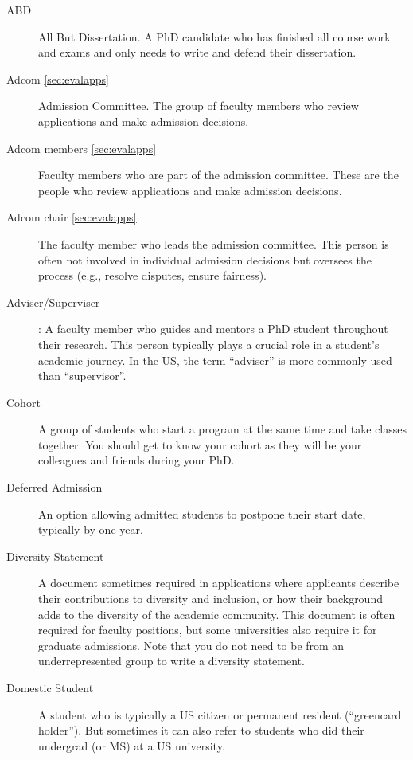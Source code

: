 \documentclass[oneside,11pt,dvipsnames]{book}
\begin{document}
\begin{description}

  \item[ABD] All But Dissertation. A PhD candidate who has finished all course work and exams and only needs to write and defend their dissertation.

  \item[Adcom \autoref{sec:evalapps}] Admission Committee. The group of faculty members who review applications and make admission decisions.
  
  \item [Adcom members \autoref{sec:evalapps}] Faculty members who are part of the admission committee. These are the people who review applications and make admission decisions.
  
  \item[Adcom chair \autoref{sec:evalapps}] The faculty member who leads the admission committee. This person is often not involved in individual admission decisions but oversees the process (e.g., resolve disputes, ensure fairness).
  
  \item[Adviser/Superviser]: A faculty member who guides and mentors a PhD student throughout their research. This person typically plays a crucial role in a student's academic journey. In the US, the term ``adviser'' is more commonly used than ``supervisor''.
  
  \item[Cohort] A group of students who start a program at the same time and take classes together. You should get to know your cohort as they will be your colleagues and friends during your PhD.
  
  \item [Deferred Admission] An option allowing admitted students to postpone their start date, typically by one year.
  \item [Diversity Statement] A document sometimes required in applications where applicants describe their contributions to diversity and inclusion, or how their background adds to the diversity of the academic community. This document is often required for faculty positions, but some universities also require it for graduate admissions. Note that you do not need to be from an underrepresented group to write a diversity statement.
  
  \item[Domestic Student] A student who is typically a US citizen or permanent resident (``greencard holder'').
        But sometimes it can also refer to students who did their undergrad (or MS) at a US university.


\end{description}
\end{document}
